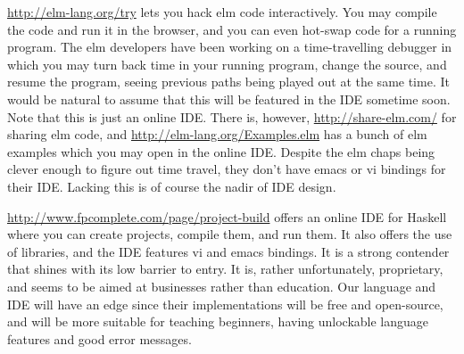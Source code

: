 \url{http://elm-lang.org/try} lets you hack elm code interactively. You may
compile the code and run it in the browser, and you can even hot-swap code for
a running program. The elm developers have been working on a time-travelling
debugger in which you may turn back time in your running program, change the
source, and resume the program, seeing previous paths being played out at the
same time. It would be natural to assume that this will be featured in the IDE
sometime soon.  Note that this is just an online IDE.  There is, however,
\url{http://share-elm.com/} for sharing elm code, and
\url{http://elm-lang.org/Examples.elm} has a bunch of elm examples which you
may open in the online IDE. Despite the elm chaps being clever enough to figure
out time travel, they don't have emacs or vi bindings for their IDE.  Lacking
this is of course the nadir of IDE design.

\url{http://www.fpcomplete.com/page/project-build} offers an online IDE for
Haskell where you can create projects, compile them, and run them. It also
offers the use of libraries, and the IDE features vi and emacs bindings.  It is
a strong contender that shines with its low barrier to entry. It is, rather
unfortunately, proprietary, and seems to be aimed at businesses rather than
education. Our language and IDE will have an edge since their implementations
will be free and open-source, and will be more suitable for teaching beginners,
having unlockable language features and good error messages.
